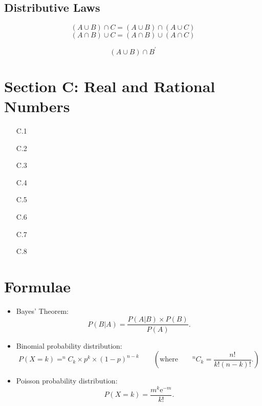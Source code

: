 {{{\subsection*{Distributive Laws}
\[ (A \cup B) \cap C =  (A \cup B) \cap (A \cup C)  \]
\[ (A \cap B) \cup C =  (A \cap B) \cup (A \cap C)  \]


\[ (A \cup B) \cap B^{\prime} \]
\section*{Section C: Real and Rational Numbers}
\begin{itemize}
\item[C.1]
\item[C.2]
\item[C.3]
\item[C.4]
\item[C.5]
\item[C.6]
\item[C.7]
\item[C.8]
\end{itemize}
\newpage
\newpage
\section*{Formulae}
\begin{itemize}




\item Bayes' Theorem:
\begin{equation*}
P(B|A)=\frac{P\left(A|B\right) \times P(B) }{P\left( A\right) }.
\end{equation*}



\item Binomial probability distribution:
\begin{equation*}
P(X = k) = ^{n}C_{k} \times p^{k} \times \left( 1-p\right) ^{n-k}\qquad \left( \text{where}\qquad
^{n}C_{k} =\frac{n!}{k!\left(n-k\right) !}. \right)
\end{equation*}

\item Poisson probability distribution:
\begin{equation*}
P(X = k) =\frac{m^{k}\mathrm{e}^{-m}}{k!}.
\end{equation*}
\end{itemize}

}}}

